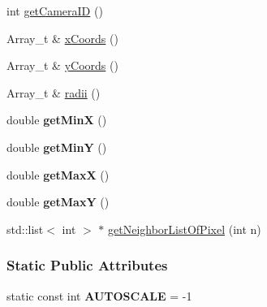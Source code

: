 \begin{DoxyCompactItemize}
\item 
int \hyperlink{classCamera_ac105d042bd3d5d7bad73ce3b2d8e7fb6}{getCameraID} ()
\item 
\hypertarget{classCamera_a8a4b74941bc6cfcd97ec1b135f6fec09}{
Array\_\-t \& \hyperlink{classCamera_a8a4b74941bc6cfcd97ec1b135f6fec09}{xCoords} ()}
\label{classCamera_a8a4b74941bc6cfcd97ec1b135f6fec09}

\item 
\hypertarget{classCamera_af2892e20c0a16ae802fcd8cc454bf59d}{
Array\_\-t \& \hyperlink{classCamera_af2892e20c0a16ae802fcd8cc454bf59d}{yCoords} ()}
\label{classCamera_af2892e20c0a16ae802fcd8cc454bf59d}

\item 
\hypertarget{classCamera_a6757b477302e1147fbcc5a5a6bb58122}{
Array\_\-t \& \hyperlink{classCamera_a6757b477302e1147fbcc5a5a6bb58122}{radii} ()}
\label{classCamera_a6757b477302e1147fbcc5a5a6bb58122}

\item 
\hypertarget{classCamera_a81881f3c5efe5c378457d825a719bcf8}{
double {\bfseries getMinX} ()}
\label{classCamera_a81881f3c5efe5c378457d825a719bcf8}

\item 
\hypertarget{classCamera_adc954eada08c2d7b9ce84860a9ccb77c}{
double {\bfseries getMinY} ()}
\label{classCamera_adc954eada08c2d7b9ce84860a9ccb77c}

\item 
\hypertarget{classCamera_a67522350c901f9143f60f7c0c31a4e37}{
double {\bfseries getMaxX} ()}
\label{classCamera_a67522350c901f9143f60f7c0c31a4e37}

\item 
\hypertarget{classCamera_a9a18da3683ade906048a58a110574fc4}{
double {\bfseries getMaxY} ()}
\label{classCamera_a9a18da3683ade906048a58a110574fc4}

\item 
\hypertarget{classCamera_a8c5b3c611d93f62e80d2de1dd9bef888}{
std::list$<$ int $>$ $\ast$ \hyperlink{classCamera_a8c5b3c611d93f62e80d2de1dd9bef888}{getNeighborListOfPixel} (int n)}
\label{classCamera_a8c5b3c611d93f62e80d2de1dd9bef888}

\end{DoxyCompactItemize}
\subsubsection*{Static Public Attributes}
\begin{DoxyCompactItemize}
\item 
\hypertarget{classCamera_ad4b47a9bd69e1f761922fefaa0f1ad10}{
static const int {\bfseries AUTOSCALE} = -\/1}
\label{classCamera_ad4b47a9bd69e1f761922fefaa0f1ad10}

\end{DoxyCompactItemize}


